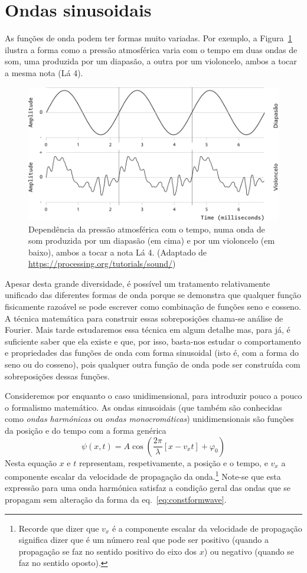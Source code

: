\section{Ondas sinusoidais}\label{sec:hamonicwaves}
As funções de onda podem ter formas muito variadas. Por exemplo, a
Figura~\ref{fig:20-cello} ilustra a forma como a pressão atmosférica varia com o
tempo em duas ondas de som, uma produzida por um diapasão, a outra por um
violoncelo, ambos a tocar a mesma nota (Lá 4).
\begin{figure}[htb]
{\centering
\includegraphics[width=0.5\linewidth]{figs/f20-cello.png}\par
}
\caption{Dependência da pressão atmosférica com o tempo, numa onda de som
produzida por um diapasão (em cima) e por um violoncelo (em baixo), ambos a
tocar a nota Lá 4. (Adaptado de
\protect\url{https://processing.org/tutorials/sound/})\label{fig:20-cello}}
\end{figure}
Apesar desta grande diversidade, é possível um tratamento relativamente
unificado das diferentes formas de onda porque se demonstra que qualquer função
fisicamente razoável se pode escrever como combinação de funções seno e cosseno.
A técnica matemática para construir essas sobreposições chama-se análise de
Fourier. Mais tarde estudaremos essa técnica em algum detalhe mas, para já, é
suficiente saber que ela existe e que, por isso, basta-nos estudar o
comportamento e propriedades das funções de onda com forma sinusoidal (isto é,
com a forma do seno ou do cosseno), pois qualquer outra função de onda pode ser
construída com sobreposições dessas funções.

Consideremos por enquanto o caso unidimensional, para introduzir pouco a pouco o
formalismo matemático. As ondas sinusoidais (que também são conhecidas como
\emph{ondas harmónicas} ou \emph{ondas monocro\-máticas}) unidimensionais são
funções da posição e do tempo com a forma genérica
\begin{equation}\label{eq:hwav}
    \psi(x,t)=A\cos\left(\frac{2\pi}{\lambda}\left[x-v_xt\right]+
            \varphi_0\right)
\end{equation}
Nesta equação $x$ e $t$ representam, respetivamente, a posição e o tempo, e
$v_x$ a componente escalar da velocidade de propagação da onda.\footnote{Recorde
que dizer que $v_x$ é a componente escalar da velocidade de propagação significa
dizer que é um número real que pode ser positivo (quando a propagação se faz no
sentido positivo do eixo dos $x$) ou negativo (quando se faz no sentido
oposto).}
Note-se que esta expressão para uma onda harmónica satisfaz a condição geral das
ondas que se propagam sem alteração da forma da eq.~\eqref{eq:constformwave}.

